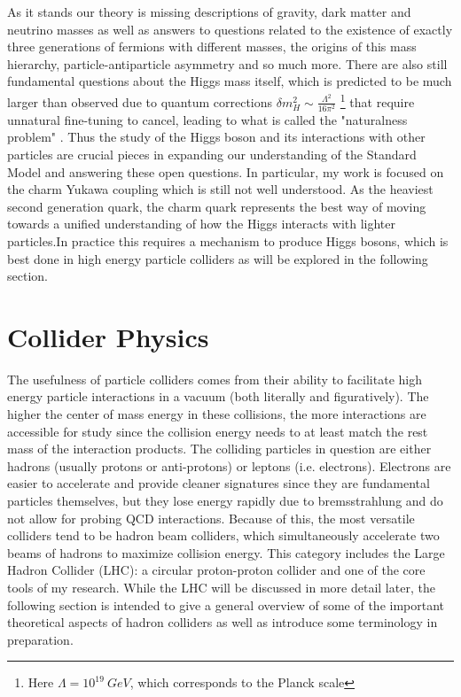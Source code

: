 As it stands our theory is missing descriptions of gravity, dark matter and neutrino masses as well as answers 
to questions related to the existence of exactly three generations of fermions with different masses, the origins 
of this mass hierarchy, particle-antiparticle asymmetry and so much more. There are also still fundamental 
questions about the Higgs mass itself, which is predicted to be much larger than observed due to quantum 
corrections $\delta m_H^2 \sim \frac{\Lambda^2}{16\pi^2}$ \footnote{Here $\Lambda = 10^{19}\ GeV$, which 
corresponds to the Planck scale} that require unnatural fine-tuning to cancel, leading to what is called the 
"naturalness problem" \cite{susskind-naturalness}. Thus the study of the Higgs boson and its interactions 
with other particles are crucial pieces in expanding our understanding of the Standard Model and answering 
these open questions. In particular, my work is focused on the charm Yukawa coupling which is still not well 
understood.  As the heaviest second generation quark, the charm quark represents the best way of moving 
towards a unified understanding of how the Higgs interacts with lighter particles.In practice this requires a 
mechanism to produce Higgs bosons, which is best done in high energy particle colliders as will be explored 
in the following section.

\section{Collider Physics}

The usefulness of particle colliders comes from their ability to facilitate high energy particle interactions in 
a vacuum (both literally and figuratively). The higher the center of mass energy in these collisions, the more 
interactions are accessible for study since the collision energy needs to at least match the rest mass of the 
interaction products. The colliding particles in question are either hadrons (usually protons or anti-protons) 
or leptons (i.e. electrons). Electrons are easier to accelerate and provide cleaner signatures since they are 
fundamental particles themselves, but they lose energy rapidly due to bremsstrahlung and do not allow for 
probing QCD interactions. Because of this, the most versatile colliders tend to be hadron beam colliders, 
which simultaneously accelerate two beams of hadrons to maximize collision energy. This category includes 
the Large Hadron Collider (LHC): a circular proton-proton collider and one of the core tools of my research. 
While the LHC will be discussed in more detail later, the following section is intended to give a general 
overview of some of the important theoretical aspects of hadron colliders as well as introduce some 
terminology in preparation.

